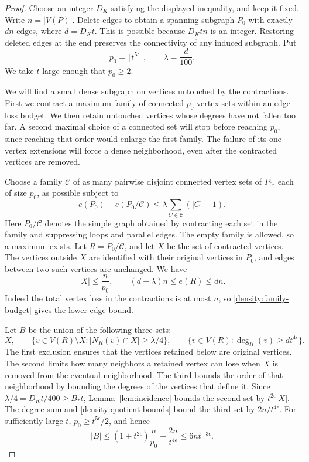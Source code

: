 \begin{proof}
Choose an integer \(D_K\) satisfying the displayed inequality, and keep
it fixed. Write \(n=|V(P)|\). Delete edges to obtain a spanning subgraph
\(P_0\) with exactly \(dn\) edges, where \(d=D_Kt\).
This is possible because \(D_Ktn\) is an integer.
Restoring deleted edges at the end preserves the connectivity of any
induced subgraph. Put
\[
 p_0=\lfloor t^{5\epsilon}\rfloor,\qquad
 \lambda=\frac d{100}.
\]
We take \(t\) large enough that \(p_0\ge2\).

We will find a small dense subgraph on vertices untouched by the
contractions. First we contract a maximum family of connected
\(p_0\)-vertex sets within an edge-loss budget. We then retain
untouched vertices whose degrees have not fallen too far. A second
maximal choice of a connected set will stop before reaching \(p_0\),
since reaching that order would enlarge the first family. The failure
of its one-vertex extensions will force a dense neighborhood, even
after the contracted vertices are removed.

Choose a family \(\mathcal C\) of as many pairwise disjoint connected
vertex sets of \(P_0\), each of size \(p_0\), as possible subject to
\begin{equation}\label{density:family-budget}
 e(P_0)-e(P_0/\mathcal C)
 \le \lambda\sum_{C\in\mathcal C}(|C|-1).
\end{equation}
Here \(P_0/\mathcal C\) denotes the simple graph obtained by contracting
each set in the family and suppressing loops and parallel edges.
The empty family is allowed, so a maximum exists.
Let \(R=P_0/\mathcal C\), and let \(X\) be the set of contracted vertices.
The vertices outside \(X\) are identified with their original vertices
in \(P_0\), and edges between two such vertices are unchanged. We have
\begin{equation}\label{density:quotient-bounds}
 |X|\le\frac n{p_0},
 \qquad
 (d-\lambda)n\le e(R)\le dn.
\end{equation}
Indeed the total vertex loss in the contractions is at most \(n\),
so \eqref{density:family-budget} gives the lower edge bound.

Let \(B\) be the union of the following three sets:
\[
 X,\qquad
 \{v\in V(R)\setminus X:|N_R(v)\cap X|\ge\lambda/4\},
 \qquad
 \{v\in V(R):\deg_R(v)\ge dt^{4\epsilon}\}.
\]
The first exclusion ensures that the vertices retained below are
original vertices. The second limits how many neighbors a retained
vertex can lose when \(X\) is removed from the eventual neighborhood.
The third bounds the order of that neighborhood by bounding the degrees
of the vertices that define it.
Since \(\lambda/4=D_Kt/400\ge B_*t\), Lemma~\ref{lem:incidence} bounds
the second set by \(t^{2\epsilon}|X|\).
The degree sum and \eqref{density:quotient-bounds} bound the third
set by \(2n/t^{4\epsilon}\).
For sufficiently large \(t\), \(p_0\ge t^{5\epsilon}/2\), and hence
\begin{equation}\label{density:bad-size}
 |B|\le(1+t^{2\epsilon})\frac n{p_0}+\frac{2n}{t^{4\epsilon}}
 \le6nt^{-3\epsilon}.
\end{equation}


\end{proof}
